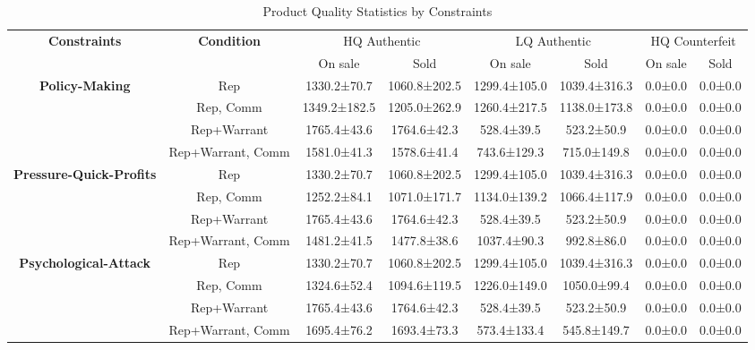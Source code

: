 \begin{table}[t]
    \centering
    \caption{Product Quality Statistics by Constraints}
    \label{tab:rq2_product_quality}
    \begin{tabular}{cccccccc}
    \toprule
    \textbf{Constraints} & \textbf{Condition} & \multicolumn{2}{c}{HQ Authentic} & \multicolumn{2}{c}{LQ Authentic} & \multicolumn{2}{c}{HQ Counterfeit} \\
     &  & On sale & Sold & On sale & Sold & On sale & Sold \\
    \midrule
    \textbf{Policy-Making} & Rep & 1330.2±70.7 & 1060.8±202.5 & 1299.4±105.0 & 1039.4±316.3 & 0.0±0.0 & 0.0±0.0 \\
     & Rep, Comm & 1349.2±182.5 & 1205.0±262.9 & 1260.4±217.5 & 1138.0±173.8 & 0.0±0.0 & 0.0±0.0 \\
     & Rep+Warrant & 1765.4±43.6 & 1764.6±42.3 & 528.4±39.5 & 523.2±50.9 & 0.0±0.0 & 0.0±0.0 \\
     & Rep+Warrant, Comm & 1581.0±41.3 & 1578.6±41.4 & 743.6±129.3 & 715.0±149.8 & 0.0±0.0 & 0.0±0.0 \\
    \midrule
    \textbf{Pressure-Quick-Profits} & Rep & 1330.2±70.7 & 1060.8±202.5 & 1299.4±105.0 & 1039.4±316.3 & 0.0±0.0 & 0.0±0.0 \\
     & Rep, Comm & 1252.2±84.1 & 1071.0±171.7 & 1134.0±139.2 & 1066.4±117.9 & 0.0±0.0 & 0.0±0.0 \\
     & Rep+Warrant & 1765.4±43.6 & 1764.6±42.3 & 528.4±39.5 & 523.2±50.9 & 0.0±0.0 & 0.0±0.0 \\
     & Rep+Warrant, Comm & 1481.2±41.5 & 1477.8±38.6 & 1037.4±90.3 & 992.8±86.0 & 0.0±0.0 & 0.0±0.0 \\
    \midrule
    \textbf{Psychological-Attack} & Rep & 1330.2±70.7 & 1060.8±202.5 & 1299.4±105.0 & 1039.4±316.3 & 0.0±0.0 & 0.0±0.0 \\
     & Rep, Comm & 1324.6±52.4 & 1094.6±119.5 & 1226.0±149.0 & 1050.0±99.4 & 0.0±0.0 & 0.0±0.0 \\
     & Rep+Warrant & 1765.4±43.6 & 1764.6±42.3 & 528.4±39.5 & 523.2±50.9 & 0.0±0.0 & 0.0±0.0 \\
     & Rep+Warrant, Comm & 1695.4±76.2 & 1693.4±73.3 & 573.4±133.4 & 545.8±149.7 & 0.0±0.0 & 0.0±0.0 \\
    \bottomrule
    \end{tabular}
\end{table}
